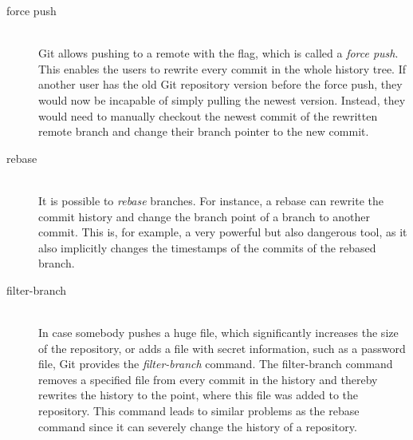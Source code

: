 \begin{description}
    \item[force push] \hfill \\
        Git allows pushing to a remote with the  flag, which is called a \emph{force push}.
        This enables the users to rewrite every commit in the whole history tree.
        If another user has the old Git repository version before the force push, they would now be incapable of simply pulling the newest version.
        Instead, they would need to manually checkout the newest commit of the rewritten remote branch and change their branch pointer to the new commit.

    \item[rebase] \hfill \\
        It is possible to \emph{rebase} branches. For instance, a rebase can rewrite the commit history and change the branch point of a branch to another commit.
        This is, for example, a very powerful but also dangerous tool, as it also implicitly changes the timestamps of the commits of the rebased branch.

    \item[filter-branch] \hfill \\
        In case somebody pushes a huge file, which significantly increases the size of the repository, or adds a file with secret information, such as a password file, Git provides the \emph{filter-branch} command.
        The filter-branch command removes a specified file from every commit in the history and thereby rewrites the history to the point, where this file was added to the repository.
        This command leads to similar problems as the rebase command since it can severely change the history of a repository.

\end{description}
